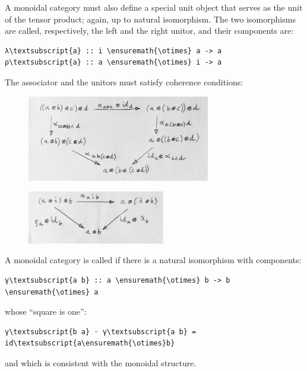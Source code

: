 A monoidal category must also define a special unit object 
that serves as the unit of the tensor product; again, up to natural
isomorphism. The two isomorphisms are called, respectively, the left and
the right unitor, and their components are:

\begin{Verbatim}[commandchars=\\\{\}]
λ\textsubscript{a} :: i \ensuremath{\otimes} a -> a
ρ\textsubscript{a} :: a \ensuremath{\otimes} i -> a
\end{Verbatim}
The associator and the unitors must satisfy coherence conditions:

\begin{figure}[H]
\centering
\includegraphics[width=80mm]{images/assoc.jpg}
\end{figure}

\begin{figure}[H]
\centering
\includegraphics[width=60mm]{images/idcoherence.jpg}
\end{figure}

\noindent
A monoidal category is called  if there is a natural
isomorphism with components:

\begin{Verbatim}[commandchars=\\\{\}]
γ\textsubscript{a b} :: a \ensuremath{\otimes} b -> b \ensuremath{\otimes} a
\end{Verbatim}
whose ``square is one'':

\begin{Verbatim}[commandchars=\\\{\}]
γ\textsubscript{b a} ◦ γ\textsubscript{a b} = id\textsubscript{a\ensuremath{\otimes}b}
\end{Verbatim}
and which is consistent with the monoidal structure.

